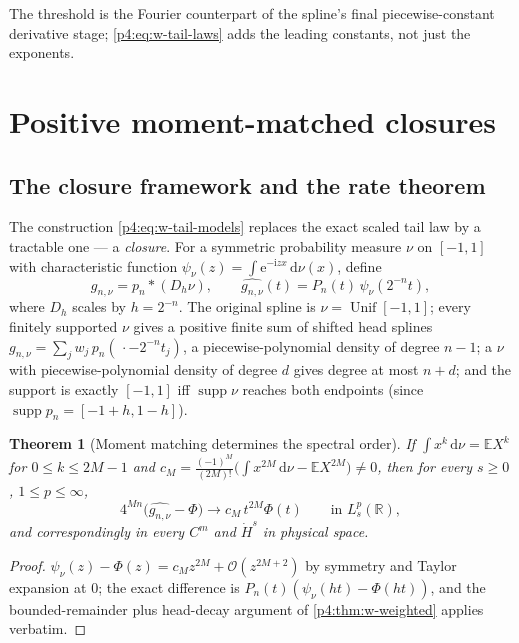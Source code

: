 \documentclass[11pt,oneside]{article}
\numberwithin{equation}{section}
\newtheorem{theorem}{Theorem}[section]
\theoremstyle{definition}
\theoremstyle{remark}
\newcommand{\R}{\mathbb R}
\newcommand{\E}{\mathbb E}
\newcommand{\supp}{\operatorname{supp}}
\newcommand{\dd}{\,\mathrm d}
\newcommand{\e}{\mathrm e}
\newcommand{\ii}{\mathrm i}
\newcommand{\bigO}{\mathcal O}
\begin{document}
The threshold is the Fourier counterpart of the spline's final
piecewise-constant derivative stage; \eqref{p4:eq:w-tail-laws} adds the leading
constants, not just the exponents.


\section{Positive moment-matched closures}
\label{p4:sec:w-closures}

\subsection{The closure framework and the rate theorem}

The construction \eqref{p4:eq:w-tail-models} replaces the exact scaled tail
law by a tractable one --- a \emph{closure}.  For a symmetric probability
measure $\nu$ on $[-1,1]$ with characteristic function
$\psi_\nu(z)=\int\e^{-\ii zx}\dd\nu(x)$, define
\begin{equation}
 g_{n,\nu}=p_n*(D_h\nu),
 \qquad
 \widehat{g_{n,\nu}}(t)=P_n(t)\,\psi_\nu(2^{-n}t),
 \label{p4:eq:w-closure}
\end{equation}
where $D_h$ scales by $h=2^{-n}$.  The original spline is
$\nu=\operatorname{Unif}[-1,1]$; every finitely supported $\nu$ gives a
positive finite sum of shifted head splines
$g_{n,\nu}=\sum_jw_j\,p_n(\,\cdot-2^{-n}t_j)$, a piecewise-polynomial
density of degree $n-1$; a $\nu$ with piecewise-polynomial density of
degree $d$ gives degree at most $n+d$; and the support is exactly $[-1,1]$
iff $\supp\nu$ reaches both endpoints (since
$\supp p_n=[-1+h,1-h]$).

\begin{theorem}[Moment matching determines the spectral order]
\label{p4:thm:w-closure-rate}
If $\int x^k\dd\nu=\E X^k$ for $0\le k\le2M-1$ and
$c_M=\frac{(-1)^M}{(2M)!}\bigl(\int x^{2M}\dd\nu-\E X^{2M}\bigr)\ne0$,
then for every $s\ge0$, $1\le p\le\infty$,
\begin{equation}
 4^{Mn}\bigl(\widehat{g_{n,\nu}}-\Phi\bigr)
 \longrightarrow c_M\,t^{2M}\Phi(t)
 \qquad\text{in }L^p_s(\R),
 \label{p4:eq:w-closure-limit}
\end{equation}
and correspondingly in every $C^m$ and $\dot H^s$ in physical space.
\end{theorem}

\begin{proof}
$\psi_\nu(z)-\Phi(z)=c_Mz^{2M}+\bigO(z^{2M+2})$ by symmetry and Taylor
expansion at $0$; the exact difference is
$P_n(t)(\psi_\nu(ht)-\Phi(ht))$, and the bounded-remainder plus
head-decay argument of \cref{p4:thm:w-weighted} applies verbatim.
\end{proof}
\end{document}

